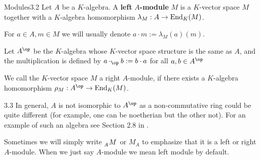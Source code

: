 \documentclass[twoside = false,	%
		headsepline,		%
		parskip = true,
		]{scrbook}						%
\begin{document}
        \begin{definition}{Modules}{3.2}
            Let $A$ be a $K$-algebra. A \textbf{left} $A$\textbf{-module} $M$ is a $K$-vector space $M$ together with a $K$-algebra homomorphism $\lambda_M: A \to \mathrm{End}_K(M)$.

            For $a \in A, m \in M$ we will usually denote $a \cdot m := \lambda_M(a)(m)$.

            Let $A^{\op}$ be the $K$-algebra whose $K$-vector space structure is the same as $A$, and the multiplication is defined by $a \cdot_{\op} b:= b \cdot a$ for all $a,b \in A^{\op}$

            We call the $K$-vector space $M$ a right $A$-module, if there exists a $K$-algebra homomorphism $\rho_M: A^\op \to \End_K(M)$.
        \end{definition}
        
        \begin{remark}{}{3.3}
            In general, $A$ is not isomorphic to $A^\op$ as a non-commutative ring could be quite different (for example, one can be noetherian but the other not). For an example of such an algebra see Section 2.8 in \cite{Jacobson.2009}.
        \end{remark}
        Sometimes we will simply write $\tensor[_A]{M}{}$ or $M_A$ to emphasize that it is a left or right $A$-module. When we just say $A$-module we mean left module by default.
\end{document}
